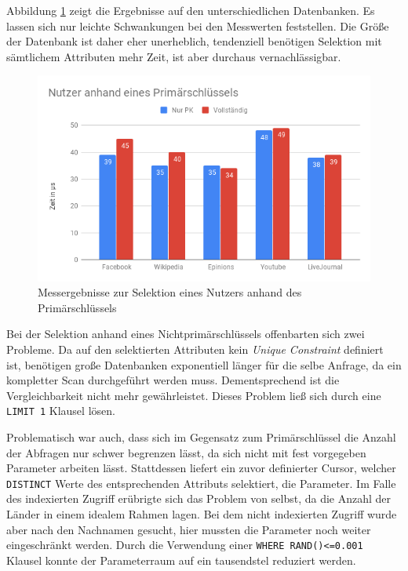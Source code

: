 Abbildung \ref{fig:NutzerPk} zeigt die Ergebnisse auf den unterschiedlichen Datenbanken. Es lassen sich nur leichte Schwankungen bei den Messwerten feststellen. Die Größe der Datenbank ist daher eher unerheblich, tendenziell benötigen Selektion mit sämtlichem Attributen mehr Zeit, ist aber durchaus vernachlässigbar.
\begin{figure}[h]
	\centering
	\includegraphics[width=\textwidth]{images/NutzerPk.png}
	\caption{Messergebnisse zur Selektion eines Nutzers anhand des Primärschlüssels}
	\label{fig:NutzerPk}
\end{figure}

Bei der Selektion anhand eines Nichtprimärschlüssels offenbarten sich zwei Probleme. Da auf den selektierten Attributen kein \emph{Unique Constraint} definiert ist, benötigen große Datenbanken exponentiell länger für die selbe Anfrage, da ein kompletter Scan durchgeführt werden muss. Dementsprechend ist die Vergleichbarkeit nicht mehr gewährleistet. Dieses Problem ließ sich durch eine \lstinline{LIMIT 1} Klausel lösen.

Problematisch war auch, dass sich im Gegensatz zum Primärschlüssel die Anzahl der Abfragen nur schwer begrenzen lässt, da sich nicht mit fest vorgegeben Parameter arbeiten lässt. Stattdessen liefert ein zuvor definierter Cursor, welcher \lstinline{DISTINCT} Werte des entsprechenden Attributs selektiert, die Parameter. Im Falle des indexierten Zugriff erübrigte sich das Problem von selbst, da die Anzahl der Länder in einem idealem Rahmen lagen. Bei dem nicht indexierten Zugriff wurde aber nach den Nachnamen gesucht, hier mussten die Parameter noch weiter eingeschränkt werden. Durch die Verwendung einer \lstinline{WHERE RAND()<=0.001} Klausel konnte der Parameterraum auf ein tausendstel reduziert werden.

